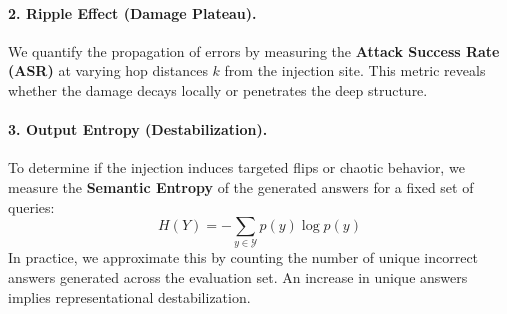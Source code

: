 \paragraph{2. Ripple Effect (Damage Plateau).}
We quantify the propagation of errors by measuring the \textbf{Attack Success Rate (ASR)} at varying hop distances $k$ from the injection site. This metric reveals whether the damage decays locally or penetrates the deep structure.

\paragraph{3. Output Entropy (Destabilization).}
To determine if the injection induces targeted flips or chaotic behavior, we measure the \textbf{Semantic Entropy} of the generated answers for a fixed set of queries:
\begin{equation}
    H(Y) = -\sum_{y \in \mathcal{Y}} p(y) \log p(y)
\end{equation}
In practice, we approximate this by counting the number of unique incorrect answers generated across the evaluation set. An increase in unique answers implies representational destabilization.